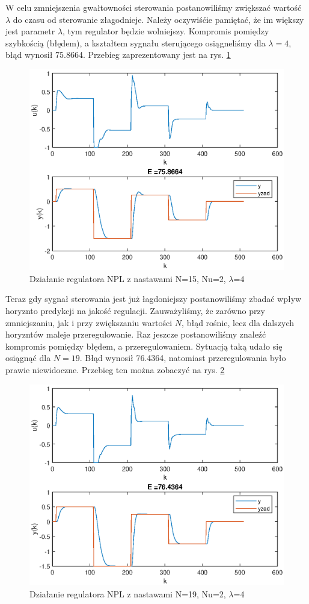 		W celu zmniejszenia gwałtowności sterowania postanowiliśmy zwiększać wartość $\lambda$ do czasu od sterowanie złagodnieje. Należy oczywiśćie pamiętać, że im większy jest parametr $\lambda$, tym regulator będzie wolniejszy. Kompromis pomiędzy szybkością (błędem), a kształtem sygnału sterującego osiągneliśmy dla $\lambda=4$, błąd wynosił 75.8664. Przebieg zaprezentowany jest na rys. \ref{fig:NPL1}
		
		\begin{figure}[h!]
			\centering
			\includegraphics[width=0.7\linewidth]{img/strojenieNPL_N_15_Nu_2_lam_4.eps}
			\caption{Działanie regulatora NPL z nastawami N=15, Nu=2, $\lambda$=4}
			\label{fig:NPL1}
		\end{figure}
		
		\newpage
		Teraz gdy sygnał sterowania jest już łagdoniejszy postanowiliśmy zbadać wpływ horyznto predykcji na jakość regulacji. Zauważyliśmy, że zarówno przy zmniejszaniu, jak i przy zwiększaniu wartości $N$, błąd rośnie, lecz dla dalszych horyzntów maleje przeregulowanie. Raz jeszcze postanowiliśmy znaleźć kompromis pomiędzy błędem, a przeregulowaniem. Sytuacją taką udało się osiągnąć dla $N=19$. Błąd wynosił 76.4364, natomiast przeregulowania było prawie niewidoczne.
		Przebieg ten można zobaczyć na rys. \ref{fig:NPL2}
		
		\begin{figure}[h!]
			\centering
			\includegraphics[width=0.7\linewidth]{img/strojenieNPL_N_19_Nu_2_lam_4.eps}
			\caption{Działanie regulatora NPL z nastawami N=19, Nu=2, $\lambda$=4}
			\label{fig:NPL2}
		\end{figure}
	
